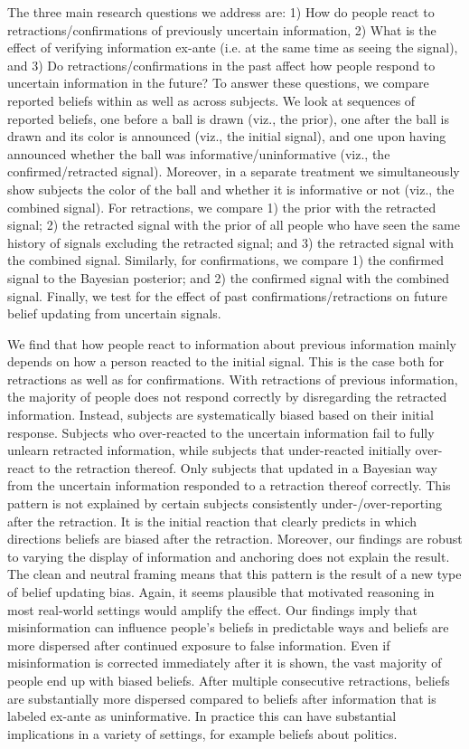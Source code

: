 \documentclass{article}
\begin{document}
The three main research questions we address are: 1) How do people react to retractions/confirmations of previously uncertain information, 2) What is the effect of verifying information ex-ante (i.e. at the same time as seeing the signal), and 3) Do retractions/confirmations in the past affect how people respond to uncertain information in the future? To answer these questions, we compare reported beliefs within as well as across subjects. We look at sequences of reported beliefs, one before a ball is drawn (viz., the prior), one after the ball is drawn and its color is announced (viz., the initial signal), and one upon having announced whether the ball was informative/uninformative (viz., the confirmed/retracted signal). Moreover, in a separate treatment we simultaneously show subjects the color of the ball and whether it is informative or not (viz., the combined signal). For retractions, we compare 1) the prior with the retracted signal; 2) the retracted signal with the prior of all people who have seen the same history of signals excluding the retracted signal; and 3) the retracted signal with the combined signal. Similarly, for confirmations, we compare 1) the confirmed signal to the Bayesian posterior; and 2) the confirmed signal with the combined signal. Finally, we test for the effect of past confirmations/retractions on future belief updating from uncertain signals.

We find that how people react to information about previous information mainly depends on how a person reacted to the initial signal. This is the case both for retractions as well as for confirmations. With retractions of previous information, the majority of people does not respond correctly by disregarding the retracted information. Instead, subjects are systematically biased based on their initial response. Subjects who over-reacted to the uncertain information fail to fully unlearn retracted information, while subjects that under-reacted initially over-react to the retraction thereof. Only subjects that updated in a Bayesian way from the uncertain information responded to a retraction thereof correctly. This pattern is not explained by certain subjects consistently under-/over-reporting after the retraction. It is the initial reaction that clearly predicts in which directions beliefs are biased after the retraction. Moreover, our findings are robust to varying the display of information and anchoring does not explain the result. The clean and neutral framing means that this pattern is the result of a new type of belief updating bias. Again, it seems plausible that motivated reasoning in most real-world settings would amplify the effect. Our findings imply that misinformation can influence people's beliefs in predictable ways and beliefs are more dispersed after continued exposure to false information. Even if misinformation is corrected immediately after it is shown, the vast majority of people end up with biased beliefs. After multiple consecutive retractions, beliefs are substantially more dispersed compared to beliefs after information that is labeled ex-ante as uninformative. In practice this can have substantial implications in a variety of settings, for example beliefs about politics.
\end{document}
